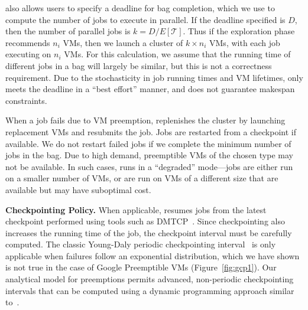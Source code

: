 \sysname also allows users to specify a deadline for bag completion, which we use to compute the number of jobs to execute in parallel.
If the deadline specified is $D$, then the number of parallel jobs is $k=D/E[\mathcal{T}]$.
Thus if the exploration phase recommends $n_i$ VMs, then we launch a cluster of $k\times n_i$ VMs, with each job executing on $n_i$ VMs. 
For this calculation, we assume that the running time of different jobs in a bag will largely be similar, but this is not a correctness requirement.
Due to the stochasticity in job running times and VM lifetimes, \sysname only meets the deadline in a ``best effort'' manner, and does not guarantee makespan constraints. 

When a job fails due to VM preemption, \sysname replenishes the cluster by launching replacement VMs and resubmits the job. 
Jobs are restarted from a checkpoint if available. 
We do not restart failed jobs if we complete the minimum number of jobs in the bag.
Due to high demand, preemptible VMs of the chosen type may not be available.
In such cases, \sysname runs in a ``degraded'' mode---jobs are either run on a smaller number of VMs, or are run on VMs of a different size that are available but may have suboptimal cost.  


\noindent \textbf{Checkpointing Policy.} When applicable, \sysname resumes jobs from the latest checkpoint performed using tools such as DMTCP~\cite{ansel2009dmtcp}.
Since checkpointing also increases the running time of the job, the checkpoint interval must be carefully computed. 
The classic Young-Daly periodic checkpointing interval~\cite{daly2006higher} is only applicable when failures follow an exponential distribution, which we have shown is not true in the case of Google Preemptible VMs (Figure~\ref{fig:gcp1}). 
Our analytical model for preemptions permits advanced, non-periodic checkpointing intervals that can be computed using a dynamic programming approach similar to~\cite{bougeret_checkpointing_2011}. 









